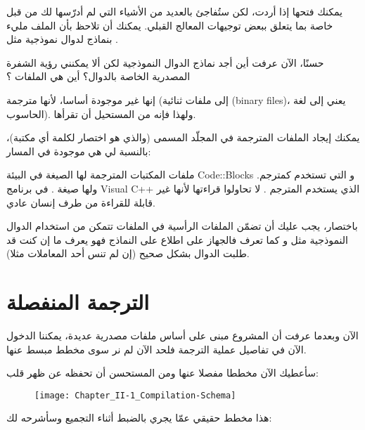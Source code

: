 يمكنك فتحها إذا أردت، لكن ستُفاجئ بالعديد من الأشياء التي لم أدرّسها لك من قبل خاصة بما يتعلق ببعض توجيهات المعالج القبلي. يمكنك أن تلاحظ بأن الملف مليء بنماذج لدوال نموذجية مثل
.

\begin{question}
  حسنًا، الآن عرفت أين أجد نماذج الدوال النموذجية لكن ألا يمكنني رؤية الشفرة المصدرية الخاصة بالدوال؟ أين هي الملفات
؟
\end{question}

إنها غير موجودة أساسا، لأنها مترجمة (إلى ملفات ثنائية
(\textenglish{binary files})،
يعني إلى لغة الحاسوب). ولهذا فإنه من المستحيل أن تقرأها.

يمكنك إيجاد الملفات المترجمة في المجلّد المسمى
(والذي هو اختصار لكلمة
أي مكتبة)، بالنسبة لي هي موجودة في المسار:


ملفات المكتبات المترجمة لها الصيغة
في البيئة
\textenglish{Code::Blocks}
و التي تستخدم
كمترجم. ولها صيغة
.
في برنامج
\textenglish{Visual C++}
الذي يستخدم المترجم
.
لا تحاولوا قراءتها لأنها غير قابلة للقراءة من طرف إنسان عادي.

باختصار، يجب عليك أن تضمّن الملفات الرأسية
في الملفات
تتمكن من استخدام الدوال النموذجية مثل
و كما تعرف فالجهاز على اطلاع على النماذج فهو يعرف ما إن كنت قد طلبت الدوال بشكل صحيح (إن لم تنس أحد المعاملات مثلا).

\section{الترجمة المنفصلة}

الآن وبعدما عرفت أن المشروع مبنى على أساس ملفات مصدرية عديدة، يمكننا الدخول الآن في تفاصيل عملية الترجمة فلحد الآن لم نر سوى مخطط مبسط عنها.

سأعطيك الآن مخططا مفصلا عنها ومن المستحسن أن تحفظه عن ظهر قلب:

\begin{figure}[H]
	\centering
	\texttt{[image: Chapter\_II-1\_Compilation-Schema]}
\end{figure}

هذا مخطط حقيقي عمّا يجري بالضبط أثناء التجميع وسأشرحه لك:

